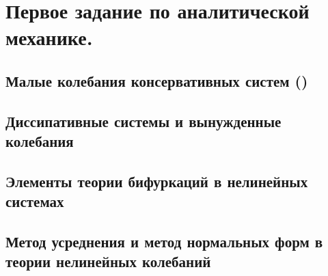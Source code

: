 



\section{Первое задание по аналитической механике.}


\subsection{Малые колебания консервативных систем \texorpdfstring{(\checkmark)}{(ок)}}



\subsection{Диссипативные системы и вынужденные колебания}


\newpage

\subsection{Элементы теории бифуркаций в нелинейных системах}


\subsection{Метод усреднения и метод нормальных форм в теории нелинейных колебаний}
